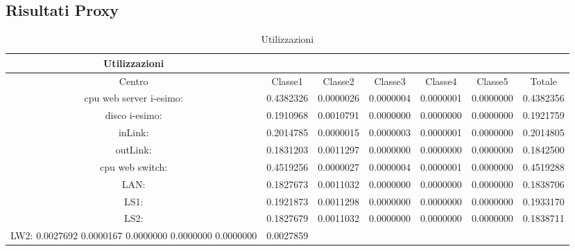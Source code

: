 \subsection{Risultati Proxy}
\begin{table}[htbp]
\begin{center}
\begin{tabular}{||c|c|c|c|c|c|c||}
\hline
Utilizzazioni\\
\hline
Centro &Classe1 &Classe2 &Classe3 &Classe4 &Classe5 &Totale\\
\hline
\hline
 cpu web server i-esimo: 	&0.4382326	&0.0000026	&0.0000004	&0.0000001	&0.0000000	&0.4382356\\
\hline
 disco i-esimo: 	&0.1910968	&0.0010791	&0.0000000	&0.0000000	&0.0000000	&0.1921759\\
\hline
 inLink: 	&0.2014785	&0.0000015	&0.0000003	&0.0000001	&0.0000000	&0.2014805\\
\hline
 outLink: 	&0.1831203	&0.0011297	&0.0000000	&0.0000000	&0.0000000	&0.1842500\\
\hline
 cpu web switch: 	&0.4519256	&0.0000027	&0.0000004	&0.0000001	&0.0000000	&0.4519288\\
\hline
 LAN: 	&0.1827673	&0.0011032	&0.0000000	&0.0000000	&0.0000000	&0.1838706\\
\hline
 LS1: 	&0.1921873	&0.0011298	&0.0000000	&0.0000000	&0.0000000	&0.1933170\\
\hline
 LS2:	&0.1827679	&0.0011032	&0.0000000	&0.0000000	&0.0000000	&0.1838711\\
\hline
 LW2: 	0.0027692	0.0000167	0.0000000	0.0000000	0.0000000	&0.0027859\\
\hline
\end{tabular}
\end{center}
\caption{Utilizzazioni}
\label{utilizzazioni}
\end{table}

